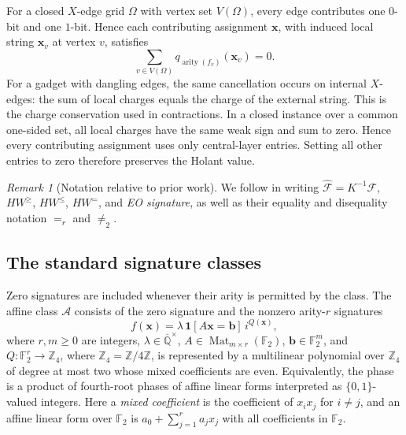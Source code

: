 \documentclass[11pt,letterpaper,onecolumn]{article}
\theoremstyle{plain}
\theoremstyle{definition}
\theoremstyle{remark}
\newtheorem{remark}[remark]{Remark}
\newcommand{\AlgNums}{\overline{\mathbb Q}}
\newcommand{\Ftwo}{\mathbb F_2}
\newcommand{\cF}{\mathcal F}
\newcommand{\cA}{\mathscr A}
\newcommand{\Mat}{\operatorname{Mat}}
\newcommand{\arity}{\operatorname{arity}}
\newcommand{\Eq}{=}
\newcommand{\Neq}{\neq}
\newcommand{\one}{\mathbf 1}
\begin{document}
	For a closed \(X\)-edge grid \(\Omega\) with vertex set \(V(\Omega)\), every edge
	contributes one \(0\)-bit and one \(1\)-bit.  Hence each contributing
	assignment \({\mathbf x}\), with induced local string \({\mathbf x}_v\) at vertex \(v\), satisfies
	\begin{equation*}
		\sum_{v\in V(\Omega)}q_{\arity(f_v)}({\mathbf x}_v)=0.
	\end{equation*}
	For a gadget with dangling edges, the same cancellation occurs on internal
\(X\)-edges: the sum of local charges equals the charge of the external
string.  This is the charge conservation used in contractions.  In a closed
instance over a common one-sided set, all local charges have the same weak
sign and sum to zero.  Hence every contributing assignment uses only
central-layer entries. Setting all other entries to zero therefore
preserves the Holant value.
	
	\begin{remark}[Notation relative to prior work]
		\label{rem:mwxz-notation}
		We follow \cite[Sections~2.1--2.3]{MengWangXiaZheng2025} in writing
		\(\widehat{\cF}=K^{-1}\cF\), \(HW^{\ge}\), \(HW^{\le}\), \(HW^=\),
		and \emph{EO signature}, as well as their equality and disequality
        notation \(\Eq_r\) and \(\Neq_2\).
		
	\end{remark}
	
	\subsection{The standard signature classes}
	\label{subsec:standard-classes}
	
	Zero signatures are included whenever their arity is permitted by the
	class.  The affine class
	\(\cA\) consists of the zero signature and the nonzero arity-\(r\) signatures
	\begin{equation}
		f({\mathbf x})=\lambda\,\one[A{\mathbf x}={\mathbf b}]\,i^{Q({\mathbf x})},
		\label{eq:affine-class}
	\end{equation}
	where \(r,m\ge0\) are integers,
	\(\lambda\in\AlgNums^\times\),
	\(A\in\Mat_{m\times r}(\Ftwo)\), \({\mathbf b}\in\Ftwo^m\), and
	\(Q:\Ftwo^r\to\mathbb Z_4\), where
	\(\mathbb Z_4=\mathbb Z/4\mathbb Z\), is represented by a multilinear
	polynomial over \(\mathbb Z_4\) of degree at most two whose mixed
	coefficients are even.
	Equivalently, the phase is a product of fourth-root phases of affine linear
	forms interpreted as \(\{0,1\}\)-valued integers.
	Here a \emph{mixed coefficient} is the coefficient of \(x_ix_j\) for
	\(i\ne j\), and an affine linear form over \(\Ftwo\) is
	\(a_0+\sum_{j=1}^r a_jx_j\) with all coefficients in \(\Ftwo\).
	
\end{document}
